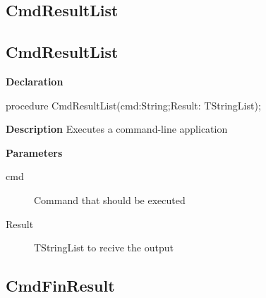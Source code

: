 \documentclass{report}
\newif\ifpdf
\begin{document}
\subsection*{\large{\textbf{CmdResultList}}\normalsize\hspace{1ex}\hrulefill}
\else
\subsection*{CmdResultList}
\fi
\label{common-CmdResultList}
\begin{list}{}{
\setlength{\itemindent}{0cm}
\setlength{\listparindent}{0cm}
\setlength{\leftmargin}{\evensidemargin}
\addtolength{\leftmargin}{\tmplength}
\settowidth{\labelsep}{X}
\addtolength{\leftmargin}{\labelsep}
\setlength{\labelwidth}{\tmplength}
}
\item[\textbf{Declaration}\hfill]
\ifpdf
\begin{flushleft}
\fi
\begin{ttfamily}
procedure CmdResultList(cmd:String;Result: TStringList);\end{ttfamily}

\ifpdf
\end{flushleft}
\fi

\par
\item[\textbf{Description}]
Executes a command{-}line application  \par
\item[\textbf{Parameters}]
\begin{description}
\item[cmd] Command that should be executed
\item[Result] TStringList to recive the output
\end{description}


\end{list}
\ifpdf
\subsection*{\large{\textbf{CmdFinResult}}\normalsize\hspace{1ex}\hrulefill}
\else
\end{document}
